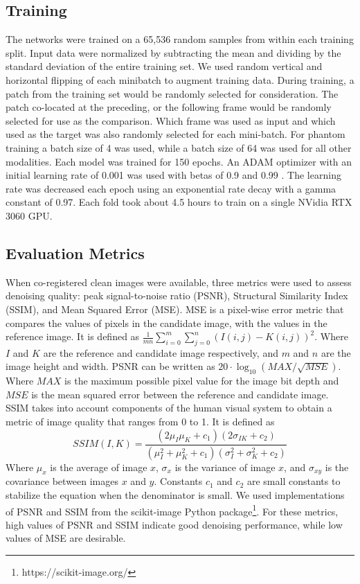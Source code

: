 \documentclass[journal,twoside,web]{ieeecolor}
\begin{document}
\subsection{Training}

The networks were trained on a 65,536 random samples from within each training split. Input data were normalized by subtracting the mean and dividing by the standard deviation of the entire training set. We used random vertical and horizontal flipping of each minibatch to augment training data. During training, a patch from the training set would be randomly selected for consideration. The patch co-located at the preceding, or the following frame would be randomly selected for use as the comparison. Which frame was used as input and which used as the target was also randomly selected for each mini-batch. For phantom training a batch size of 4 was used, while a batch size of 64 was used for all other modalities. Each model was trained for 150 epochs. An ADAM optimizer with an initial learning rate of 0.001 was used with betas of 0.9 and 0.99 \cite{Kingma2015}. The learning rate was decreased each epoch using an exponential rate decay with a gamma constant of 0.97. Each fold took about 4.5 hours to train on a single NVidia RTX 3060 GPU.

\subsection{Evaluation Metrics}
When co-registered clean images were available, three metrics were used to assess denoising quality: peak signal-to-noise ratio (PSNR), Structural Similarity Index (SSIM)\cite{Wang2002}, and Mean Squared Error (MSE). MSE is a pixel-wise error metric that compares the values of pixels in the candidate image, with the values in the reference image. It is defined as $\frac{1}{mn} \sum_{i=0}^m\sum_{j=0}^n(I(i,j) - K(i,j))^2$. Where $I$ and $K$ are the reference and candidate image respectively, and $m$ and $n$ are the image height and width. PSNR can be written as $20\cdot\log_{10}(MAX/\sqrt{MSE})$. Where $MAX$ is the maximum possible pixel value for the image bit depth and $MSE$ is the mean squared error between the reference and candidate image. SSIM takes into account components of the human visual system to obtain a metric of image quality that ranges from 0 to 1. It is defined as
\begin{equation}
	SSIM(I,K) = \frac{(2\mu_I\mu_K + c_1)(2\sigma_{IK}+c_2)}{(\mu_I^2 + \mu_K^2 + c_1)(\sigma_I^2 + \sigma_K^2 + c_2)}
\end{equation}
Where $\mu_x$ is the average of image $x$, $\sigma_x$ is the variance of image $x$, and $\sigma_{xy}$ is the covariance between images $x$ and $y$. Constants $c_1$ and $c_2$ are small constants to stabilize the equation when the denominator is small. We used implementations of PSNR and SSIM from the scikit-image Python package\footnote{https://scikit-image.org/}. For these metrics, high values of PSNR and SSIM indicate good denoising performance, while low values of MSE are desirable. 
\end{document}
